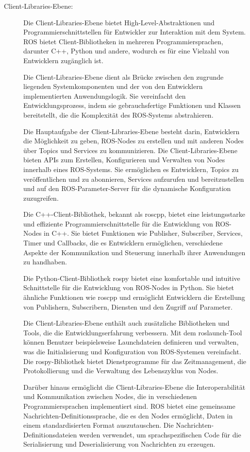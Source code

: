 \begin{description}
    
    \item[Client-Libraries-Ebene:] Die Client-Libraries-Ebene bietet High-Level-Abstraktionen und Programmierschnittstellen für Entwickler zur Interaktion mit dem System. \ac{ROS} bietet Client-Bibliotheken in mehreren Programmiersprachen, darunter C++, Python und andere, wodurch es für eine Vielzahl von Entwicklern zugänglich ist.

    Die Client-Libraries-Ebene dient als Brücke zwischen den zugrunde liegenden Systemkomponenten und der von den Entwicklern implementierten Anwendungslogik. Sie vereinfacht den Entwicklungsprozess, indem sie gebrauchsfertige Funktionen und Klassen bereitstellt, die die Komplexität des \ac{ROS}-Systems abstrahieren.
    
    Die Hauptaufgabe der Client-Libraries-Ebene besteht darin, Entwicklern die Möglichkeit zu geben, ROS-Nodes zu erstellen und mit anderen Nodes über Topics und Services zu kommunizieren. Die Client-Libraries-Ebene bieten APIs zum Erstellen, Konfigurieren und Verwalten von Nodes innerhalb eines \ac{ROS}-Systems. Sie ermöglichen es Entwicklern, Topics zu veröffentlichen und zu abonnieren, Services aufzurufen und bereitzustellen und auf den ROS-Parameter-Server für die dynamische Konfiguration zuzugreifen.
    
    Die C++-Client-Bibliothek, bekannt als roscpp, bietet eine leistungsstarke und effiziente Programmierschnittstelle für die Entwicklung von ROS-Nodes in C++. Sie bietet Funktionen wie Publisher, Subscriber, Services, Timer und Callbacks, die es Entwicklern ermöglichen, verschiedene Aspekte der Kommunikation und Steuerung innerhalb ihrer Anwendungen zu handhaben.
    
    Die Python-Client-Bibliothek rospy bietet eine komfortable und intuitive Schnittstelle für die Entwicklung von ROS-Nodes in Python. Sie bietet ähnliche Funktionen wie roscpp und ermöglicht Entwicklern die Erstellung von Publishern, Subscribern, Diensten und den Zugriff auf Parameter.
    
    Die Client-Libraries-Ebene enthält auch zusätzliche Bibliotheken und Tools, die die Entwicklungserfahrung verbessern. Mit dem roslaunch-Tool können Benutzer beispielsweise Launchdateien definieren und verwalten, was die Initialisierung und Konfiguration von \ac{ROS}-Systemen vereinfacht. Die rospy-Bibliothek bietet Dienstprogramme für das Zeitmanagement, die Protokollierung und die Verwaltung des Lebenszyklus von Nodes.
    
    Darüber hinaus ermöglicht die Client-Libraries-Ebene die Interoperabilität und Kommunikation zwischen Nodes, die in verschiedenen Programmiersprachen implementiert sind. \ac{ROS} bietet eine gemeinsame Nachrichten-Definitionssprache, die es den Nodes ermöglicht, Daten in einem standardisierten Format auszutauschen. Die Nachrichten-Definitionsdateien werden verwendet, um sprachspezifischen Code für die Serialisierung und Deserialisierung von Nachrichten zu erzeugen. 
   

\end{description}
